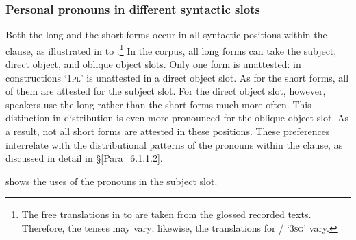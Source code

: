 \subsubsection[Personal pronouns in different syntactic slots]{Personal pronouns in different syntactic slots}
\label{Para_6.1.1.1}
Both the long and the short  forms occur in all syntactic positions within the clause, as illustrated in  to .\footnote{The free translations in  to  are taken from the glossed recorded texts. Therefore, the tenses may vary; likewise, the translations for / ‘\textsc{3sg}’ vary.} In the corpus, all long  forms can take the subject, direct object, and oblique object slots. Only one form is unattested: in  constructions  ‘\textsc{1pl}’ is unattested in a direct object slot. As for the short  forms, all of them are attested for the subject slot. For the direct object slot, however, speakers use the long  rather than the short forms much more often. This distinction in distribution is even more pronounced for the oblique object slot. As a result, not all short  forms are attested in these positions. These preferences interrelate with the distributional patterns of the pronouns within the clause, as discussed in detail in §\ref{Para_6.1.1.2}.

\largerpage

 shows the uses of the pronouns in the subject slot.


